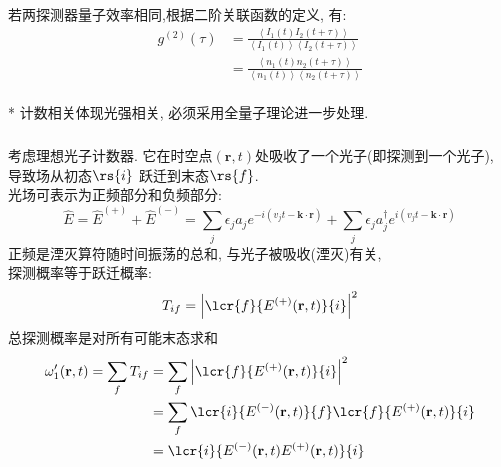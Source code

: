 
 \begin{frame}  
  \frametitle{}
      若两探测器量子效率相同,根据二阶关联函数的定义, 有:
      \[ \begin{aligned}
        g^{(2)}(\tau) &= \frac{\left\langle I_1 (t)  I_2 (t+ \tau)\right\rangle }{\left\langle I_1 (t) \right\rangle  \left\langle I_2 (t+ \tau)\right\rangle }\\ 
        &=  \frac{\left\langle n_1 (t)  n_2 (t+ \tau)\right\rangle}{\left\langle n_1 (t)\right\rangle \left\langle n_2 (t+ \tau)\right\rangle}
    \end{aligned}\] 
    ~\\ {\vspace*{2.3em}} 
    * 计数相关体现光强相关, 必须采用全量子理论进一步处理.
 \end{frame}

 \begin{frame} 
  \frametitle{}
       {\Bullet}考虑理想光子计数器. 它在时空点$(\mathbf{r}, t)$处吸收了一个光子(即探测到一个光子), 导致场从初态$\rs{i }$ 跃迁到末态$\rs{f}$. \\
       光场可表示为正频部分和负频部分:
       \[ \hat{E} = \hat{E}^{(+)} + \hat{E}^{(-)} =\sum_j \epsilon_j a_j e^{-i(v_j t - \mathbf{k}\cdot \mathbf{r})} + \sum_j \epsilon_j a^{\dagger} _j e^{i(v_j t - \mathbf{k}\cdot \mathbf{r})}\]
       正频是湮灭算符随时间振荡的总和, 与光子被吸收(湮灭)有关,\\ 
       探测概率等于跃迁概率:
       \[T_{if} = \left| \lcr{f}{E^{(+)}(\mathbf{r}, t)}{i} \right|^2\] 
       总探测概率是对所有可能末态求和
       \[ \begin{aligned}
           \omega'_1(\mathbf{r}, t) = \sum_f T_{if} &= \sum_f \left| \lcr{f}{E^{(+)}(\mathbf{r}, t)}{i} \right|^2 \\ 
           &= \sum_f \lcr{i}{E^{(-)}(\mathbf{r}, t)}{f} \lcr{f}{E^{(+)}(\mathbf{r}, t)}{i}   \\
           &= \lcr{i}{E^{(-)}(\mathbf{r}, t)E^{(+)}(\mathbf{r}, t)}{i}  
       \end{aligned}\] 
 \end{frame}

